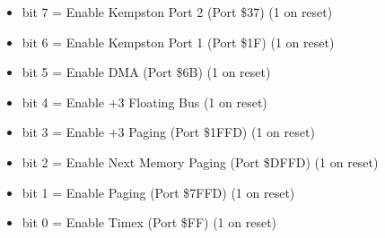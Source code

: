 \begin{itemize}
\item bit 7 = Enable Kempston Port 2 (Port \$37) (1 on reset)
\item bit 6 = Enable Kempston Port 1 (Port \$1F) (1 on reset)
\item bit 5 = Enable DMA (Port \$6B) (1 on reset)
\item bit 4 = Enable +3 Floating Bus (1 on reset)
\item bit 3 = Enable +3 Paging (Port \$1FFD) (1 on reset)
\item bit 2 = Enable Next Memory Paging (Port \$DFFD) (1 on reset)
\item bit 1 = Enable Paging (Port \$7FFD) (1 on reset)
\item bit 0 = Enable Timex (Port \$FF) (1 on reset)
\end{itemize}

